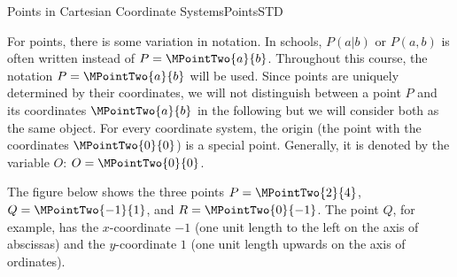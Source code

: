 \begin{MXContent}{Points in Cartesian Coordinate Systems}{Points}{STD}
\begin{MInfo}
\begin{center}
{
}
\end{center}

\end{MInfo}

For points, there is some variation in notation. In schools, $P(a|b)$ or $P(a,b)$ is often written instead of $P=\MPointTwo{a}{b}$. Throughout this course, the notation $P=\MPointTwo{a}{b}$
will be used. Since points are uniquely determined by their coordinates, we will not distinguish between a point $P$ 
and its coordinates $\MPointTwo{a}{b}$ in the following but we will consider both as the same object. 
For every coordinate system, the origin (the point with the coordinates $\MPointTwo{0}{0}$) is a special point. Generally,
it is denoted by the variable $O$: $O=\MPointTwo{0}{0}$.

\begin{MExample}
The figure below shows the three points $P=\MPointTwo{2}{4}$, $Q=\MPointTwo{-1}{1}$, and $R=\MPointTwo{0}{-1}$.
The point $Q$, for example, has the $x$-coordinate $-1$ (one unit length to the left on the axis of abscissas)
and the $y$-coordinate $1$ (one unit length upwards on the axis of ordinates).
\begin{center}
\end{center}


\end{MExample}
\end{MXContent}
